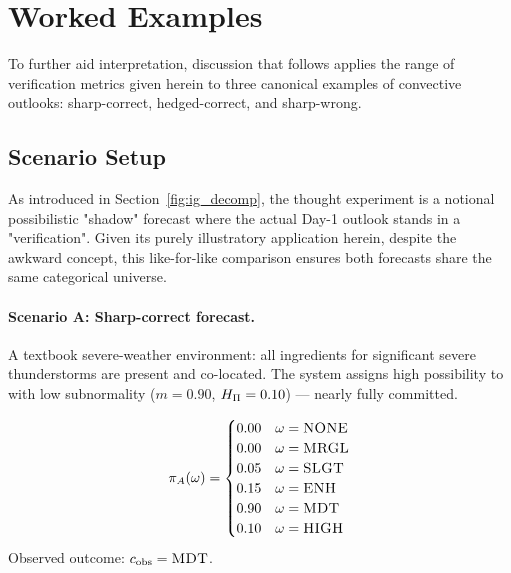 
\section{Worked Examples}\label{sec:worked_examples}

To further aid interpretation, discussion that follows
applies the range of verification metrics given herein
to three canonical examples of convective outlooks:
sharp-correct, hedged-correct, and sharp-wrong.

\subsection{Scenario Setup}\label{sec:scenario_setup}

As introduced in Section~\ref{fig:ig_decomp},
the thought experiment is a notional possibilistic
"shadow" forecast where the actual Day-1 outlook
stands in a "verification".
Given its purely illustratory application herein,
despite the awkward concept,
this like-for-like comparison ensures both forecasts
share the same categorical universe.

\paragraph{Scenario A: Sharp-correct  forecast.}

A textbook severe-weather environment: all ingredients for significant
severe thunderstorms are present and co-located. The system assigns
high possibility to  with low subnormality ($m = 0.90$,
$H_{\Pi} = 0.10$) --- nearly fully committed.

\[
\pi_A(\omega) = \begin{cases}
0.00 & \omega = \textsc{NONE} \\
0.00 & \omega = \textsc{MRGL} \\
0.05 & \omega = \textsc{SLGT} \\
0.15 & \omega = \textsc{ENH}  \\
0.90 & \omega = \textsc{MDT}  \\
0.10 & \omega = \textsc{HIGH}
\end{cases}
\]
Observed outcome: $c_{\mathrm{obs}} = \textsc{MDT}$.

